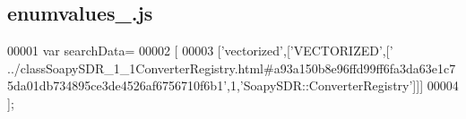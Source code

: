 \subsection{enumvalues\+\_.\+js}
\label{enumvalues__6_8js_source}

\begin{DoxyCode}
00001 var searchData=
00002 [
00003   [\textcolor{stringliteral}{'vectorized'},[\textcolor{stringliteral}{'VECTORIZED'},[\textcolor{stringliteral}{'
      ../classSoapySDR\_1\_1ConverterRegistry.html#a93a150b8e96ffd99ff6fa3da63e1c75da01db734895ce3de4526af6756710f6b1'},1,\textcolor{stringliteral}{'SoapySDR::ConverterRegistry'}]]]
00004 ];
\end{DoxyCode}
